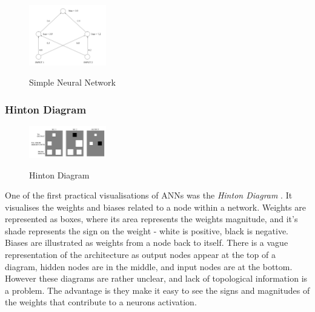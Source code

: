 \documentclass[a4paper,11pt,titlepage]{article}
\begin{document}
	 	\begin{figure}[H]
    			\centering	
			{{\includegraphics[width=0.3\textwidth]
    				{img/craven_simple_net.png} 
    			}}%
    			\caption{Simple Neural Network}%
    		\label{fig:simplenet}
	\end{figure} 	
		
\subsubsection{Hinton Diagram}

		 		
 	\begin{figure}[H]
    			\centering	
			{{\includegraphics[width=0.3\textwidth]
    				{img/craven_hinton.png} 
    			}}%
    			\caption{Hinton Diagram}%
    		\label{fig:simple}
	\end{figure} 
 		
		One of the first practical visualisations of ANNs was the \textit{Hinton Diagram} \cite{Hinton1986}. It visualises the weights and biases related to a node within a network. Weights are represented as boxes, where its area represents the weights magnitude, and it's shade represents the sign on the weight - white is positive, black is negative. Biases are illustrated as weights from a node back to itself. There is a vague representation of the architecture as output nodes appear at the top of a diagram, hidden nodes are in the middle, and input nodes are at the bottom. However these diagrams are rather unclear, and lack of topological information is a problem. The advantage is they make it easy to see the signs and magnitudes of the weights that contribute to a neurons activation.
		\\\
		\\\
		
\end{document}
